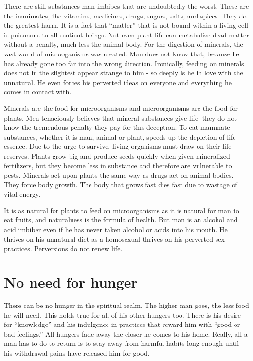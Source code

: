 \documentclass[12pt,letterpaper]{article}
\begin{document}
There are still substances man imbibes that are undoubtedly the
worst. These are the inanimates, the vitamins, medicines, drugs,
sugars, salts, and spices. They do the greatest harm. It is a fact
that ``matter'' that is not bound within a living cell is poisonous to
all sentient beings. Not even plant life can metabolize dead matter
without a penalty, much less the animal body. For the digestion of
minerals, the vast world of microoganisms was created. Man does not
know that, because he has already gone too far into the wrong
direction. Ironically, feeding on minerals does not in the slightest
appear strange to him - so deeply is he in love with the unnatural. He
even forces his perverted ideas on everyone and everything he comes in
contact with.

Minerals are the food for microorganisms and microorganisms are the
food for plants. Men tenaciously believes that mineral substances give
life; they do not know the tremendous penalty they pay for this
deception. To eat inaminate substances, whether it is man, animal or
plant, speeds up the depletion of life-essence. Due to the urge to
survive, living organisms must draw on their life-reserves. Plants
grow big and produce seeds quickly when given mineralized fertilizers,
but they become less in substance and therefore are vulnerable to
pests. Minerals act upon plants the same way as drugs act on animal
bodies. They force body growth. The body that grows fast dies fast due
to wastage of vital energy.

It is as natural for plants to feed on microorganisms as it is natural
for man to eat fruits, and naturalness is the formula of health. But
man is an alcohol and acid imbiber even if he has never taken alcohol
or acids into his mouth. He thrives on his unnatural diet as a
homosexual thrives on his perverted sex-practices. Perversions do not
renew life.

\section{No need for hunger}

There can be no hunger in the spiritual realm. The higher man goes,
the less food he will need. This holds true for all of his other
hungers too. There is his desire for ``knowledge'' and his indulgence
in practices that reward him with ``good or bad feelings.'' All
hungers fade away the closer he comes to his home. Really, all a man
has to do to return is to stay away from harmful habits long enough
until his withdrawal pains have released him for good.
\end{document}
